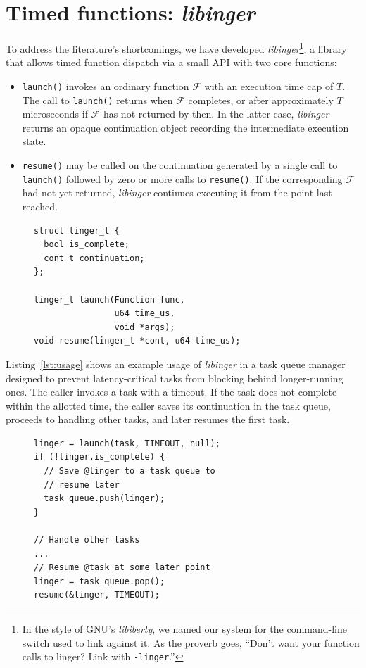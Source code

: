 \section{Timed functions: \textit{libinger}}
\label{sec:libinger}

To address the literature's shortcomings, we have developed
\textit{libinger}\footnote{In the style of GNU's \textit{libiberty}, we named our
system for the command-line switch used to link against it.  As the proverb goes,
``Don't want your function calls to linger?  Link with \texttt{-linger}.''},
a library that allows timed function dispatch via a small API with
two core functions:
\begin{itemize}
\item \texttt{launch()} invokes an ordinary function $\mathcal{F}$ with an
execution time cap of $T$.  The call to \texttt{launch()} returns when $\mathcal{F}$
completes, or after approximately $T$ microseconds if $\mathcal{F}$ has not returned
by then.  In the latter case, \textit{libinger} returns an opaque continuation
object recording the intermediate execution state.
\item \texttt{resume()} may be called on the continuation generated by a single call
to \texttt{launch()} followed by zero or more calls to \texttt{resume()}.  If the
corresponding $\mathcal{F}$ had not yet returned, \textit{libinger} continues
executing it from the point last reached.
\end{itemize}

\begin{figure}
\begin{lstlisting}[label=lst:ingerapi,caption=Preemptible functions interface]
struct linger_t {
  bool is_complete;
  cont_t continuation;
};

linger_t launch(Function func,
                u64 time_us,
                void *args);
void resume(linger_t *cont, u64 time_us);
\end{lstlisting}
\end{figure}

Listing~\ref{lst:usage} shows an example usage of \textit{libinger}
in a task queue manager designed to prevent latency-critical tasks from blocking
behind longer-running
ones. The caller invokes a task with a timeout. If the task does not complete
within the allotted time, the caller saves its continuation in the task queue,
proceeds to handling other tasks, and later resumes the first task.

\begin{figure}
\begin{lstlisting}[label=lst:usage, caption=Preemptible function usage example]
linger = launch(task, TIMEOUT, null);
if (!linger.is_complete) {
  // Save @linger to a task queue to
  // resume later
  task_queue.push(linger);
}

// Handle other tasks
...
// Resume @task at some later point
linger = task_queue.pop();
resume(&linger, TIMEOUT);
\end{lstlisting}
\end{figure}

